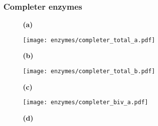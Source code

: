             \subsubsection*{Completer enzymes}
                \begin{figure}[htpb!]
                    \centering
                    \begin{minipage}{0.91\textwidth}
                        \begin{minipage}{0.1\textwidth}
                            \caption*{\small \textbf{(a)}}
                        \end{minipage}
                        \begin{minipage}{0.8\textwidth}
                            \texttt{[image: enzymes/completer\_total\_a.pdf]}
                        \end{minipage}
                    \end{minipage}
                    \begin{minipage}{0.91\textwidth}
                        \begin{minipage}{0.1\textwidth}
                            \caption*{\small \textbf{(b)}}
                        \end{minipage}
                        \begin{minipage}{0.8\textwidth}
                            \texttt{[image: enzymes/completer\_total\_b.pdf]}
                        \end{minipage}
                    \end{minipage}
                    \begin{minipage}{0.91\textwidth}
                        \begin{minipage}{0.1\textwidth}
                            \caption*{\small \textbf{(c)}}
                        \end{minipage}
                        \begin{minipage}{0.8\textwidth}
                            \texttt{[image: enzymes/completer\_biv\_a.pdf]}
                        \end{minipage}
                    \end{minipage}
                    \begin{minipage}{0.91\textwidth}
                        \begin{minipage}{0.1\textwidth}
                            \caption*{\small \textbf{(d)}}
                        \end{minipage}

\end{minipage}
\end{figure}
